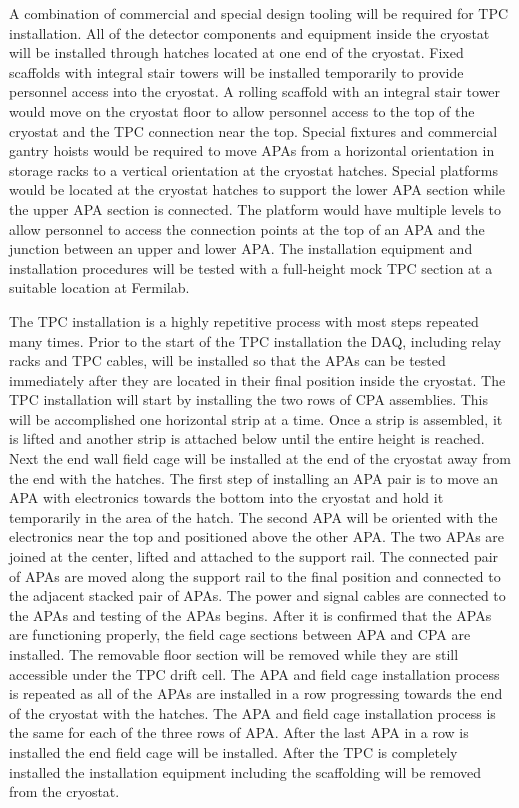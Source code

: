 A combination of commercial and special design tooling will be
required for TPC installation. All of the detector components and
equipment inside the cryostat will be installed through hatches
located at one end of the cryostat.  Fixed scaffolds with integral
stair towers will be installed temporarily to provide personnel access
into the cryostat. A rolling scaffold with an integral stair tower
would move on the cryostat floor to allow personnel access to the top
of the cryostat and the TPC connection near the top.  Special fixtures
and commercial gantry hoists would be required to move APAs from a
horizontal orientation in storage racks to a vertical orientation at
the cryostat hatches. Special platforms would be located at the
cryostat hatches to support the lower APA section while the upper APA
section is connected. The platform would have multiple levels to allow
personnel to access the connection points at the top of an APA and the
junction between an upper and lower APA. The installation equipment
and installation procedures will be tested with a full-height mock TPC
section at a suitable location at Fermilab.

The TPC installation is a highly repetitive process with most steps
repeated many times. Prior to the start of the TPC installation the
DAQ, including relay racks and TPC cables, will be installed so that
the APAs can be tested immediately after they are located in their
final position inside the cryostat. The TPC installation will start by
installing the two rows of CPA assemblies. This will be accomplished
one horizontal strip at a time. Once a strip is assembled, it is
lifted and another strip is attached below until the entire height is
reached. Next the end wall field cage will be installed at the end of
the cryostat away from the end with the hatches. The first step of
installing an APA pair is to move an APA with electronics towards the
bottom into the cryostat and hold it temporarily in the area of the
hatch. The second APA will be oriented with the electronics near the
top and positioned above the other APA. The two APAs are joined at the
center, lifted and attached to the support rail. The connected pair of
APAs are moved along the support rail to the final position and
connected to the adjacent stacked pair of APAs.  The power and signal
cables are connected to the APAs and testing of the APAs begins. After
it is confirmed that the APAs are functioning properly, the field cage
sections between APA and CPA are installed. The removable floor
section will be removed while they are still accessible under the TPC
drift cell.  The APA and field cage installation process is repeated
as all of the APAs are installed in a row progressing towards the end
of the cryostat with the hatches. The APA and field cage installation
process is the same for each of the three rows of APA. After the last
APA in a row is installed the end field cage will be installed. After
the TPC is completely installed the installation equipment including
the scaffolding will be removed from the cryostat.

